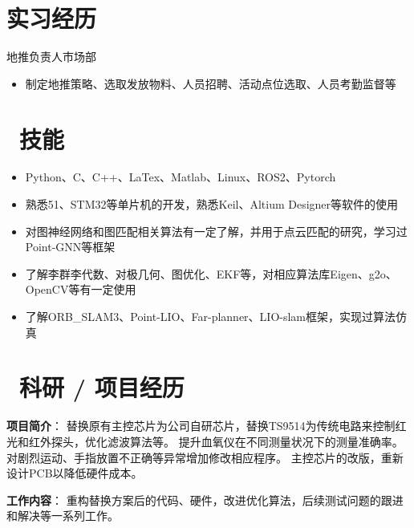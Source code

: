\documentclass{resume}
\begin{document}
\section{\textcolor[RGB]{50,50,190}{\faAlignLeft 实习经历}}

地推负责人\qquad \qquad \quad 市场部
\begin{itemize}
  \item 制定地推策略、选取发放物料、人员招聘、活动点位选取、人员考勤监督等
\end{itemize}

\section{\textcolor[RGB]{50,50,190}{\faCogs\ 技能}}
\begin{itemize}[parsep=0.5ex]
  \item Python、C、C++、LaTex、Matlab、Linux、ROS2、Pytorch
  \item 熟悉51、STM32等单片机的开发，熟悉Keil、Altium Designer等软件的使用
  \item 对图神经网络和图匹配相关算法有一定了解，并用于点云匹配的研究，学习过Point-GNN等框架
  \item 了解李群李代数、对极几何、图优化、EKF等，对相应算法库Eigen、g2o、OpenCV等有一定使用
  \item 了解ORB\_SLAM3、Point-LIO、Far-planner、LIO-slam框架，实现过算法仿真
\end{itemize}


\section{\textcolor[RGB]{50,50,190}{\faUsers\ 科研 / 项目经历}}

\textcolor[RGB]{80,100,190}{\textbf{项目简介}}：
替换原有主控芯片为公司自研芯片，替换TS9514为传统电路来控制红光和红外探头，优化滤波算法等。
提升血氧仪在不同测量状况下的测量准确率。对剧烈运动、手指放置不正确等异常增加修改相应程序。
主控芯片的改版，重新设计PCB以降低硬件成本。

\textcolor[RGB]{80,100,190}{\textbf{工作内容}}：
重构替换方案后的代码、硬件，改进优化算法，后续测试问题的跟进和解决等一系列工作。
\end{document}
